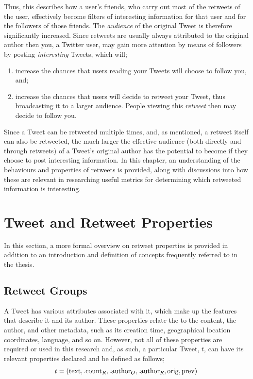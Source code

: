Thus, this describes how a user's friends, who carry out most of the retweets of the user, effectively become filters of interesting information for that user and for the followers of those friends. The \textit{audience} of the original Tweet is therefore significantly increased. Since retweets are usually always attributed to the original author then you, a Twitter user, may gain more attention by means of followers by posting \textit{interesting} Tweets, which will; 
\begin{enumerate}
\item increase the chances that users reading your Tweets will choose to follow you, and;
\item increase the chances that users will decide to retweet your Tweet, thus broadcasting it to a larger audience. People viewing this \textit{retweet} then may decide to follow you. 
\end{enumerate}

Since a Tweet can be retweeted multiple times, and, as mentioned, a retweet itself can also be retweeted, the much larger the effective audience (both directly and through retweets) of a Tweet's original author has the potential to become if they choose to post interesting information. In this chapter, an understanding of the behaviours and properties of retweets is provided, along with discussions into how these are relevant in researching useful metrics for determining which retweeted information is interesting.


\section{Tweet and Retweet Properties}
In this section, a more formal overview on retweet properties is provided in addition to an introduction and definition of concepts frequently referred to in the thesis.

\subsection{Retweet Groups}
A Tweet has various attributes associated with it, which make up the features that describe it and its author. These properties relate the to the content, the author, and other metadata, such as its creation time, geographical location coordinates, language, and so on. However, not all of these properties are required or used in this research and, as such, a particular Tweet, $t$, can have its relevant properties declared and be defined as follows;
\[
	t = (\mathrm{text}, .\textrm{count}_R, .\textrm{author}_O, .\textrm{author}_R, \mathrm{orig}, \mathrm{prev})
\]

